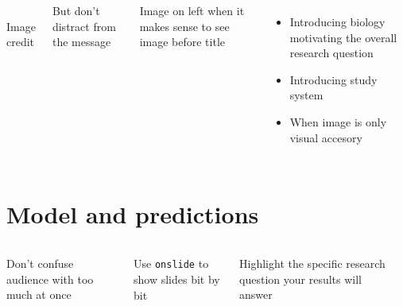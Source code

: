 \documentclass[smaller,aspectratio=149]{beamer}
\begin{document}
\begin{frame}{}
\begin{columns}[T]
	\\%
	\tiny{Image credit}\par
	\bigskip\bigskip
	But don't distract from the message \par
	\medskip Image on left when it makes sense to see image before title \par
	\begin{itemize}
		\item Introducing biology motivating the overall research question
		\item Introducing study system
		\item When image is only visual accesory
	\end{itemize}
\end{columns}
\end{frame}

\section{Model and predictions} 

\begin{frame}{}
\begin{columns}[T]
	\bigskip\bigskip
	Don't confuse audience with too much at once \par
	\medskip Use \texttt{onslide} to show slides bit by bit \par
	\bigskip \alert{Highlight the specific research question your results will answer}
	\begin{centering}%
		\par
		\medskip{}\par
	\end{centering}
\end{columns}
\end{frame}
\end{document}
